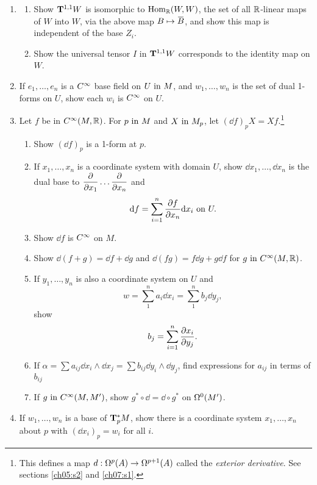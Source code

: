\documentclass[../main]{subfiles}
\begin{document}
\begin{enumerate}
    \item\label{pro:36} 
    \begin{enumerate}[label=(\roman*)]
        \item Show $\tensorbundle{W}{1}{1}$ is isomorphic to $\Hom_\bR(W,W)$, the set of all $\bR$-linear maps of $W$ into $W$, via the above map $B \mapsto \xoverline B$, and show this map is independent of the base $Z_i$.
        \item Show the universal tensor $I$ in $\tensorbundle{W}{1}{1}$ corresponds to the identity map on $W$. 
    \end{enumerate}
    
    \item\label{pro:37} If $e_1,\dots,e_n$ is a $\CInfty$ base field on $U \InText M$, and $w_1, \dots, w_n$ is the set of dual 1-forms on $U$, show each $w_i$ is $\CInfty$ on $U$. 
    
    \item\label{pro:38} Let $f$ be in $\CInfty(M,\bR)$. For $p\InText M$ and $X \InText M_p$, let $(\dd f)_p X = Xf$.\footnote{This defines a map $d : \formbundle{A}{p} \functionMaps \formbundle{A}{p+1}$ called the \emph{exterior derivative}. See sections \ref{ch05:s2} and \ref{ch07:s1}.}
    \begin{enumerate}[label = (\roman*)]
        \item Show $(\dd f)_p$ is a 1-form at $p$.
        \item If $x_1,\dots,x_n$ is a coordinate system with domain $U$, show $\dd x_1,\dots, \dd x_n$ is the dual base to $\pdv{}{x_1}\dots \pdv{}{x_n}$ and \[\dd f = \sum_{i=1}^n \pdv{f}{x_n}\dd x_i\text{ on }U.\]
        \item Show $\dd f$ is $\CInfty$ on $M$.
        \item Show $\dd(f+g) = \dd f + \dd g$ and $\dd (fg) = f\dd g + g\dd f$ for $g \InText \CInfty(M,\bR)$.
        \item If $y_1,\dots,y_n$ is also a coordinate system on $U$ and \[w = \sum_1^n a_i\dd x_i = \sum_1^n b_j \dd y_j,\] show \[b_j = \sum_{i=1}^n \pdv{x_i}{y_j}.\]
        \item If $\alpha = \sum a_{ij} \dd x_i \wedge\dd x_j = \sum b_{ij} \dd y_i\wedge \dd y_j$, find expressions for $a_{ij}$ in terms of $b_{ij}$
        \item If $g \InText \CInfty(M, M')$, show $g^*\circ \dd = \dd \circ g^*$ on $\formbundle{M'}{0}$.
    \end{enumerate}
    
    
    \item\label{pro:39} If $w_1,\dots,w_n$ is a base of $\cotangentspace{M}{p}$, show there is a coordinate system $x_1,\dots,x_n$ about $p$ with $(\dd x_i)_p = w_i$ for all $i$. 
    

\end{enumerate}
\end{document}
